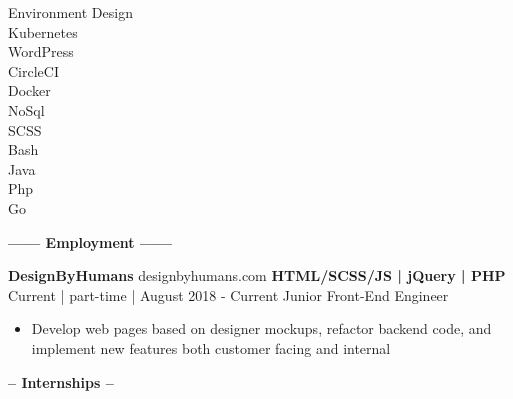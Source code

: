 \documentclass[12pt]{article}
\begin{document}
{{\begin{multicols}{2}
\begin{multicols}{2}
\begin{addmargin}[0em]{2em}
	\begin{flushright}
	\vspace{4mm}
	Environment Design\\
	Kubernetes\\
	WordPress\\
	CircleCI\\
	Docker\\
	NoSql\\
	SCSS\\
	Bash\\
	Java\\
	Php\\
	Go\\
    \end{flushright}
    \end{addmargin}

    
    \end{multicols}
    \end{multicols}
}}
    \color{secondary}
    \center
    
    \begin{center}
    \textbf{\Large------ Employment ------}\\
    \end{center}
    \vspace{-2mm}
    \begin{footnotesize}
    \flushleft
    \textbf{\color{primary}\large DesignByHumans} {\color{primary}designbyhumans.com} \hfill \textbf{\color{Cerulean}HTML/SCSS/JS | jQuery | PHP}\\ 
    {\color{primary}Current | part-time | August 2018 - Current} \hfill {\color{Cerulean} Junior Front-End Engineer}
    \vspace{-2mm}
    \begin{itemize}
        \setlength{\itemsep}{0pt}
        \item Develop web pages based on designer mockups, refactor backend code, and implement new features both customer facing and internal
    \end{itemize}
    \end{footnotesize}
    
    \begin{center}
    \textbf{\Large-- Internships --}\\
    \end{center}
    \vspace{-5mm}
\end{document}
